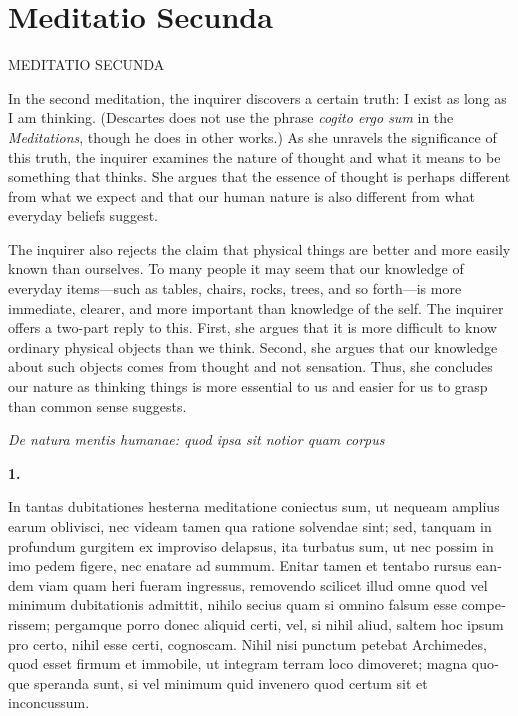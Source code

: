 \chapter{Meditatio Secunda}
%
    {\MakeUppercase{Meditatio Secunda}}


In the second meditation, the inquirer discovers a certain truth: I exist as long as I am thinking. (Descartes does not use the phrase \textit{cogito ergo sum} in the \textit{Meditations}, though he does in other works.) As she unravels the significance of this truth, the inquirer examines the nature of thought and what it means to be something that thinks. She argues that the essence of thought is perhaps different from what we expect and that our human nature is also different from what everyday beliefs suggest.

The inquirer also rejects the claim that physical things are better and more easily known than ourselves. To many people it may seem that our knowledge of everyday items---such as tables, chairs, rocks, trees, and so forth---is more immediate, clearer, and more important than knowledge of the self. The inquirer offers a two-part reply to this. First, she argues that it is more difficult to know ordinary physical objects than we think. Second, she argues that our knowledge about such objects comes from thought and not sensation. Thus, she concludes our nature as thinking things is more essential to us and easier for us to grasp than common sense suggests.

\clearpage

\clearpage
\begin{center}
    \beginnumbering
    \numberlinefalse
    \pstart
    \textit{De natura mentis humanae: quod ipsa sit notior quam corpus}
    \pend
    \endnumbering
\end{center}

\beginnumbering
\pstart
    \textbf{1.} \begin{latin}In tantas dubitationes hesterna meditatione coniectus sum, ut nequeam amplius earum oblivisci, nec videam tamen qua ratione solvendae sint; sed, tanquam in profundum gurgitem ex improviso delapsus, ita turbatus sum, ut nec possim in imo pedem figere, nec enatare ad summum. Enitar tamen et tentabo rursus eandem viam quam heri fueram ingressus, removendo scilicet illud omne quod vel minimum dubitationis admittit, nihilo secius quam si omnino falsum esse comperissem; pergamque porro donec aliquid certi, vel, si nihil aliud, saltem hoc ipsum pro certo, nihil esse certi, cognoscam. Nihil nisi punctum petebat Archimedes, quod esset firmum et immobile, ut integram terram loco dimoveret; magna quoque speranda sunt, si vel minimum quid invenero quod certum sit et inconcussum.\end{latin}
\pend
\endnumbering
\beginnumbering
\pstart

